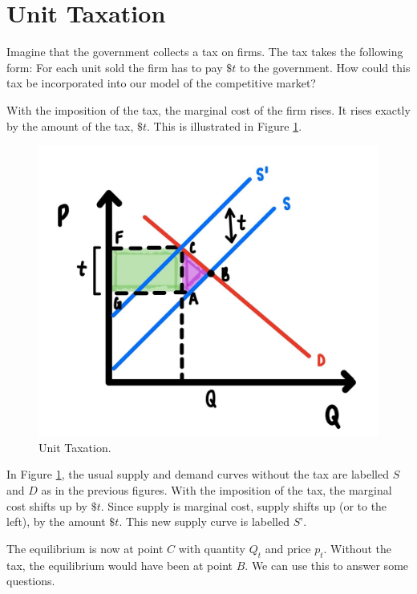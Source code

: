 \documentclass[
]{book}
\begin{document}
\hypertarget{unit-taxation}{%
\section{Unit Taxation}\label{unit-taxation}}

Imagine that the government collects a tax on firms. The tax takes the following form: For each unit sold the firm has to pay \(\$t\) to the government. How could this tax be incorporated into our model of the competitive market?

With the imposition of the tax, the marginal cost of the firm rises. It rises exactly by the amount of the tax, \(\$t\). This is illustrated in Figure \ref{fig:compmarkets03}.

\begin{figure}

{\centering \includegraphics[width=0.75\linewidth]{img/compmarkets/fig3} 

}

\caption{Unit Taxation.}\label{fig:compmarkets03}
\end{figure}

In Figure \ref{fig:compmarkets03}, the usual supply and demand curves without the tax are labelled \(S\) and \(D\) as in the previous figures. With the imposition of the tax, the marginal cost shifts up by \(\$t\). Since supply is marginal cost, supply shifts up (or to the left), by the amount \(\$t\). This new supply curve is labelled \(S’\).

The equilibrium is now at point \(C\) with quantity \(Q_t\) and price \(p_t\). Without the tax, the equilibrium would have been at point \(B\). We can use this to answer some questions.
\end{document}
